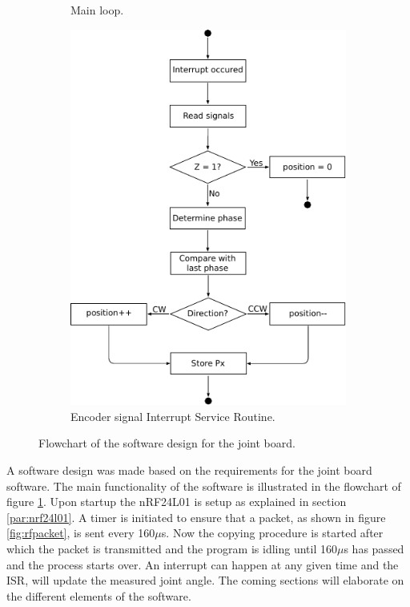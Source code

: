 \begin{figure}[h]
\begin{subfigure}[b]{0.30\textwidth}
		\caption{Main loop.}
		\label{sfig:joint_main_flowchart}
	\end{subfigure}
	\begin{subfigure}[b]{0.69\textwidth}
		\centering
		\includegraphics[width=.8\linewidth]{graphics/joint_interrupt}
		\caption{Encoder signal Interrupt Service Routine.}
		\label{sfig:joint_interrupt}
	\end{subfigure}
	\caption{Flowchart of the software design for the joint board.}
	\label{fig:joint_software}
\end{figure}
A software design was made based on the requirements for the joint board software.
The main functionality of the software is illustrated in the flowchart of figure \ref{sfig:joint_main_flowchart}.
Upon startup the nRF24L01 is setup as explained in section \ref{par:nrf24l01}.
A timer is initiated to ensure that a packet, as shown in figure \ref{fig:rfpacket}, is sent every 160$\mu$s.
Now the copying procedure is started after which the packet is transmitted and the program is idling until 160$\mu$s has passed and the process starts over.
An interrupt can happen at any given time and the ISR, will update the measured joint angle. 
The coming sections will elaborate on the different elements of the software.

